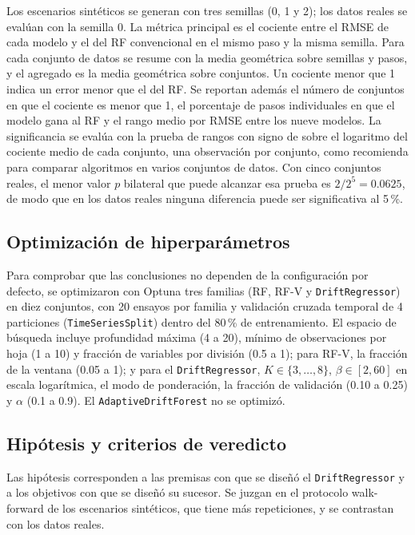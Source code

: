 \documentclass[11pt,a4paper]{article}
\begin{document}
Los escenarios sintéticos se generan con tres semillas (0, 1 y 2); los datos reales se evalúan con la
semilla 0. La métrica principal es el cociente entre el RMSE de cada modelo y el del RF convencional
en el mismo paso y la misma semilla. Para cada conjunto de datos se resume con la media geométrica
sobre semillas y pasos, y el agregado es la media geométrica sobre conjuntos. Un cociente menor que 1
indica un error menor que el del RF. Se reportan además el número de conjuntos en que el cociente es
menor que 1, el porcentaje de pasos individuales en que el modelo gana al RF y el rango medio por
RMSE entre los nueve modelos. La significancia se evalúa con la prueba de rangos con signo de
\textcite{wilcoxon1945} sobre el logaritmo del cociente medio de cada conjunto, una observación por
conjunto, como recomienda \textcite{demsar2006} para comparar algoritmos en varios conjuntos de
datos. Con cinco conjuntos reales, el menor valor $p$ bilateral que puede alcanzar esa prueba es
$2/2^5=0.0625$, de modo que en los datos reales ninguna diferencia puede ser significativa al 5\,\%.

\subsection{Optimización de hiperparámetros}

Para comprobar que las conclusiones no dependen de la configuración por defecto, se optimizaron con
Optuna \parencite{akiba2019} tres familias (RF, RF-V y \texttt{DriftRegressor}) en diez conjuntos, con
20 ensayos por familia y validación cruzada temporal de 4 particiones (\texttt{TimeSeriesSplit})
dentro del 80\,\% de entrenamiento. El espacio de búsqueda incluye profundidad máxima (4 a 20), mínimo
de observaciones por hoja (1 a 10) y fracción de variables por división (0.5 a 1); para RF-V, la
fracción de la ventana (0.05 a 1); y para el \texttt{DriftRegressor}, $K\in\{3,\dots,8\}$,
$\beta\in[2,60]$ en escala logarítmica, el modo de ponderación, la fracción de validación (0.10 a
0.25) y $\alpha$ (0.1 a 0.9). El \texttt{AdaptiveDriftForest} no se optimizó.

\subsection{Hipótesis y criterios de veredicto}\label{sec:hipotesis}

Las hipótesis corresponden a las premisas con que se diseñó el \texttt{DriftRegressor} y a los
objetivos con que se diseñó su sucesor. Se juzgan en el protocolo walk-forward de los escenarios
sintéticos, que tiene más repeticiones, y se contrastan con los datos reales.
\end{document}
